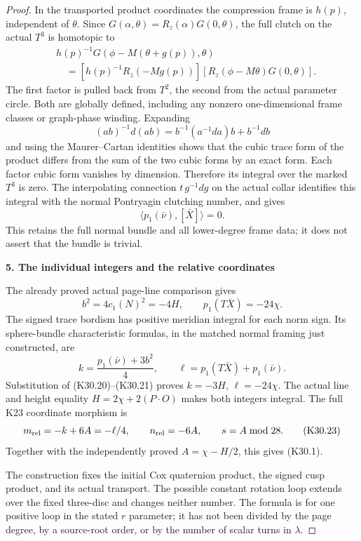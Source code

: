 \begin{proof}
In the transported product coordinates the compression
frame is \(h(p)\), independent of \(\theta\). Since
\(G(\alpha,\theta)=R_z(\alpha)G(0,\theta)\), the full
clutch on the actual \(T^3\) is homotopic to
\[
 \begin{split}
 &h(p)^{-1}G(\phi-M(\theta+g(p)),\theta)\\
 &\quad=
  [h(p)^{-1}R_z(-Mg(p))]
  [R_z(\phi-M\theta)G(0,\theta)] .
 \end{split}
 \tag{K30.19}
\]
The first factor is pulled back from \(T^2\), the second
from the actual parameter circle. Both are globally
defined, including any nonzero one-dimensional frame
classes or graph-phase winding. Expanding
\[
 (ab)^{-1}d(ab)=b^{-1}(a^{-1}da)b+b^{-1}db
\]
and using the Maurer--Cartan identities shows that the
cubic trace form of the product differs from the sum of
the two cubic forms by an exact form. Each factor cubic
form vanishes by dimension. Therefore its integral over
the marked \(T^3\) is zero. The interpolating connection
\(t\,g^{-1}dg\) on the actual collar identifies this integral
with the normal Pontryagin clutching number, and gives
\[
                    \langle p_1(\bar\nu),[\bar X]\rangle=0.
 \tag{K30.20}
\]
This retains the full normal bundle and all lower-degree
frame data; it does not assert that the bundle is trivial.

\par

\medskip\noindent\textbf{5. The individual integers and the relative coordinates}

\par\nobreak

The already proved actual page-line comparison gives
\[
 b^2=4c_1(N)^2=-4H,\qquad
 p_1(T\bar X)=-24\chi .
 \tag{K30.21}
\]
The signed trace bordism has positive meridian integral
for each norm sign. Its sphere-bundle characteristic
formulas, in the matched normal framing just constructed,
are
\[
 k=\frac{p_1(\bar\nu)+3b^2}{4},\qquad
 \ell=p_1(T\bar X)+p_1(\bar\nu).
 \tag{K30.22}
\]
Substitution of (K30.20)--(K30.21) proves
\(k=-3H\), \(\ell=-24\chi\).
The actual line and height equality
\(H=2\chi+2(P\cdot O)\) makes both integers integral.
The full K23 coordinate morphism is
\[
 m_{\rm rel}=-k+6A=-\ell/4,\qquad
 n_{\rm rel}=-6A,\qquad s=A\bmod28 .
 \tag{K30.23}
\]
Together with the independently proved
\(A=\chi-H/2\), this gives (K30.1).

The construction fixes the initial Cox quaternion product,
the signed cusp product, and its actual transport. The
possible constant rotation loop extends over the fixed
three-disc and changes neither number. The formula is for
one positive loop in the stated \(r\) parameter; it has not
been divided by the page degree, by a source-root order,
or by the number of scalar turns in \(\lambda\).


\end{proof}
